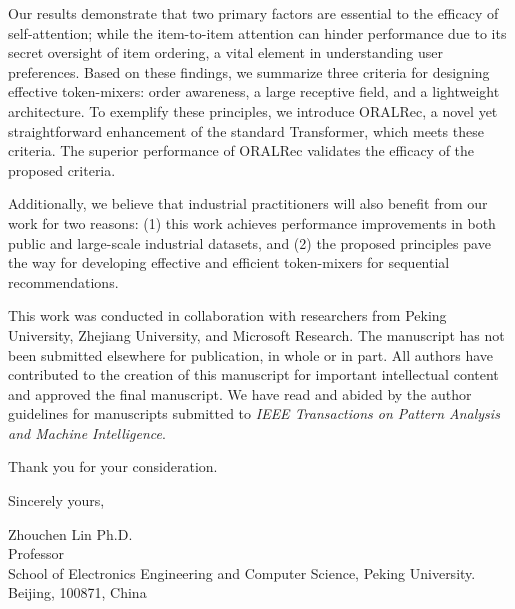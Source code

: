 \documentclass{article}
\newcommand{\journal}{IEEE Transactions on Pattern Analysis and Machine Intelligence}
\begin{document}
Our results demonstrate that two primary factors are essential to the efficacy of self-attention; while the item-to-item attention can hinder performance due to its secret oversight of item ordering, a vital element in understanding user preferences.
Based on these findings, we summarize three criteria for designing effective token-mixers: order awareness, a large receptive field, and a lightweight architecture. To exemplify these principles, we introduce ORALRec, a novel yet straightforward enhancement of the standard Transformer, which meets these criteria.  The superior performance of ORALRec validates the efficacy of the proposed criteria.

Additionally, we believe that industrial practitioners will also benefit from our work for two reasons: (1) this work achieves performance improvements in both public and large-scale industrial datasets, and (2) the proposed principles pave the way for developing effective and efficient token-mixers for sequential recommendations.

This work was conducted in collaboration with researchers from Peking University, Zhejiang University, and Microsoft Research. The manuscript has not been submitted elsewhere for publication, in whole or in part. All authors have contributed to the creation of this manuscript for important intellectual content and approved the final manuscript. We have read and abided by the author guidelines for manuscripts submitted to \textit{\journal}.

Thank you for your consideration.



\bigskip %

Sincerely yours,

\vspace{20pt} %

Zhouchen Lin Ph.D.\\
Professor\\
School of Electronics Engineering and Computer Science, Peking University. \\
Beijing, 100871, China
\end{document}
